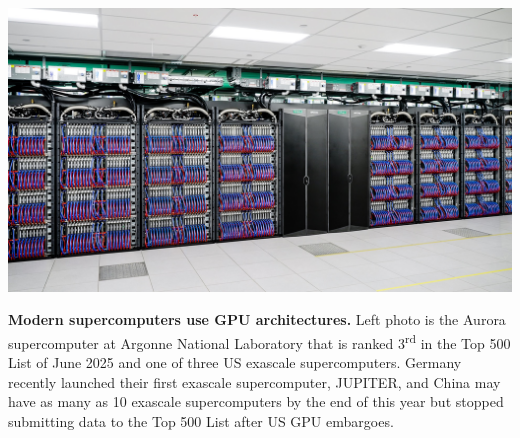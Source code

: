 \documentclass{article}
\begin{document}
\begin{tcbposter}
{  \noindent
  \begin{minipage}[c]{.36\linewidth}
    \includegraphics[width=\linewidth]{1920x1080-Aurora hero image.jpg}
  \end{minipage}
  \begin{minipage}[c]{.62\linewidth}
    \textbf{Modern supercomputers use GPU architectures.}
    Left photo is the Aurora supercomputer at Argonne National Laboratory %
    that is ranked 3\textsuperscript{rd} in the Top 500 List of June 2025 %
    and one of three US exascale supercomputers.
    Germany recently launched their first exascale supercomputer, JUPITER, %
    and China may have as many as 10 exascale supercomputers %
    by the end of this year\supercite{dongarra_2023} %
    but stopped submitting data to the Top 500 List %
    after US GPU embargoes.
  \end{minipage}

  \vspace{-.5\baselineskip}
}
\end{tcbposter}
\end{document}

